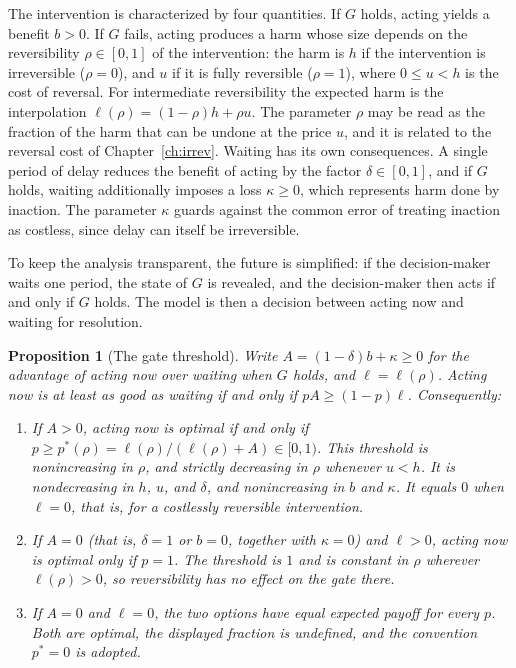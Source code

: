 \documentclass[11pt,twoside,openright]{book}
\theoremstyle{plain}
\newtheorem{proposition}[theorem]{Proposition}
\theoremstyle{definition}
\theoremstyle{remark}
\begin{document}
The intervention is characterized by four quantities. If $G$ holds, acting yields a benefit $b>0$. If $G$ fails, acting produces a harm whose size depends on the reversibility $\rho\in[0,1]$ of the intervention: the harm is $h$ if the intervention is irreversible ($\rho=0$), and $u$ if it is fully reversible ($\rho=1$), where $0\le u<h$ is the cost of reversal. For intermediate reversibility the expected harm is the interpolation $\ell(\rho)=(1-\rho)h+\rho u$. The parameter $\rho$ may be read as the fraction of the harm that can be undone at the price $u$, and it is related to the reversal cost of Chapter~\ref{ch:irrev}. Waiting has its own consequences. A single period of delay reduces the benefit of acting by the factor $\delta\in[0,1]$, and if $G$ holds, waiting additionally imposes a loss $\kappa\ge0$, which represents harm done by inaction. The parameter $\kappa$ guards against the common error of treating inaction as costless, since delay can itself be irreversible.

To keep the analysis transparent, the future is simplified: if the decision-maker waits one period, the state of $G$ is revealed, and the decision-maker then acts if and only if $G$ holds. The model is then a decision between acting now and waiting for resolution.

\begin{proposition}[The gate threshold]\label{prop:gate}
Write $A=(1-\delta)b+\kappa\ge0$ for the advantage of acting now over waiting when $G$ holds, and $\ell=\ell(\rho)$. Acting now is at least as good as waiting if and only if $pA\ge(1-p)\ell$. Consequently:
\begin{enumerate}
\item[(a)] If $A>0$, acting now is optimal if and only if $p\ge p^*(\rho)=\ell(\rho)/(\ell(\rho)+A)\in[0,1)$. This threshold is nonincreasing in $\rho$, and strictly decreasing in $\rho$ whenever $u<h$. It is nondecreasing in $h$, $u$, and $\delta$, and nonincreasing in $b$ and $\kappa$. It equals $0$ when $\ell=0$, that is, for a costlessly reversible intervention.
\item[(b)] If $A=0$ (that is, $\delta=1$ or $b=0$, together with $\kappa=0$) and $\ell>0$, acting now is optimal only if $p=1$. The threshold is $1$ and is constant in $\rho$ wherever $\ell(\rho)>0$, so reversibility has no effect on the gate there.
\item[(c)] If $A=0$ and $\ell=0$, the two options have equal expected payoff for every $p$. Both are optimal, the displayed fraction is undefined, and the convention $p^*=0$ is adopted.
\end{enumerate}
\end{proposition}
\end{document}
